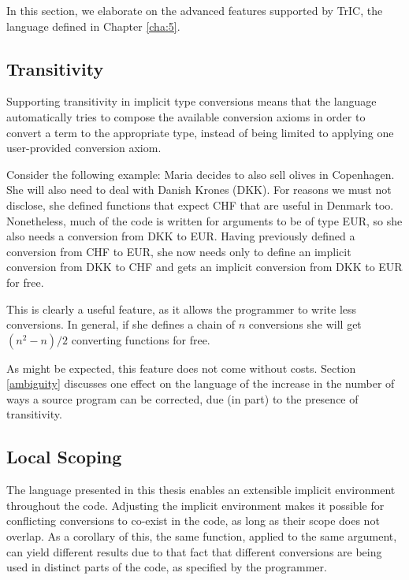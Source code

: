 In this section, we elaborate on the advanced features supported by TrIC, the language defined in Chapter \ref{cha:5}.

\subsection{Transitivity}
Supporting transitivity in implicit type conversions means that the language automatically tries to compose the available conversion axioms in order to convert a term to the appropriate type, instead of being limited to applying one user-provided conversion axiom.

Consider the following example: Maria decides to also sell olives in Copenhagen. She will also need to deal with Danish Krones (DKK). For reasons we must not disclose, she defined functions that expect CHF that are useful in Denmark too. Nonetheless, much of the code is written for arguments to be of type EUR, so she also needs a conversion from DKK to EUR. Having previously defined a conversion from CHF to EUR, she now needs only to define an implicit conversion from DKK to CHF and gets an implicit conversion from DKK to EUR for free. 

This is clearly a useful feature, as it allows the programmer to write less conversions. In general, if she defines a chain of $n$ conversions she will get $(n^2-n)/2$ converting functions for free.

As might be expected, this feature does not come without costs. Section \ref{ambiguity} discusses one effect on the language of the increase in the number of ways a source program can be corrected, due (in part) to the presence of transitivity.


\subsection{Local Scoping}
The language presented in this thesis enables an extensible implicit environment throughout the code. Adjusting the implicit environment makes it possible for conflicting conversions to co-exist in the code, as long as their scope does not overlap. As a corollary of this, the same function, applied to the same argument, can yield different results due to that fact that different conversions are being used in distinct parts of the code, as specified by the programmer.

